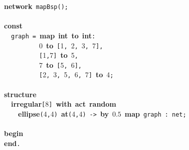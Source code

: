 {\bf network}~\verb&mapBsp&\verb&(&\verb&)&\verb&;&\\
\\
{\bf const}\\
~~\verb&graph&~\verb&=&~{\bf map}~{\bf int}~{\bf to}~{\bf int}\verb&:&\\
~~~~~~~~~~0~{\bf to}~\verb&[&1\verb&,&~2\verb&,&~3\verb&,&~7\verb&]&\verb&,&\\
~~~~~~~~~~\verb&[&1\verb&,&7\verb&]&~{\bf to}~5\verb&,&\\
~~~~~~~~~~7~{\bf to}~\verb&[&5\verb&,&~6\verb&]&\verb&,&\\
~~~~~~~~~~\verb&[&2\verb&,&~3\verb&,&~5\verb&,&~6\verb&,&~7\verb&]&~{\bf to}~4\verb&;&\\
\\
{\bf structure}\\
~~{\bf irregular}\verb&[&8\verb&]&~{\bf with}~{\bf act}~{\bf random}~\\
~~~~{\bf ellipse}\verb&(&4\verb&,&4\verb&)&~{\bf at}\verb&(&4\verb&,&4\verb&)&~\verb&->&~{\bf by}~$0.5$~{\bf map}~\verb&graph&~\verb&:&~\verb&net&\verb&;&\\
\\
{\bf begin}\\
{\bf end}\verb&.&